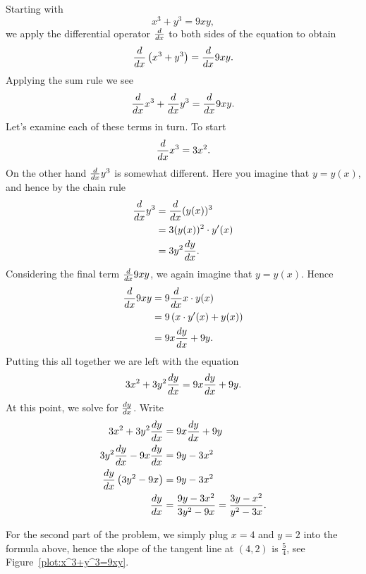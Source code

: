 \begin{solution}
Starting with 
\[
x^3+y^3 = 9xy,
\]
we apply the differential operator $\frac{d}{dx}$ to both sides of the
equation to obtain
\[
\frac{d}{dx} \left(x^3+y^3\right) = \frac{d}{dx} 9xy.
\]
Applying the sum rule we see
\[
\frac{d}{dx} x^3+\frac{d}{dx} y^3 = \frac{d}{dx} 9xy.
\]
Let's examine each of these terms in turn. To start
\[
\frac{d}{dx} x^3 = 3x^2.
\]
On the other hand $\frac{d}{dx} y^3$ is somewhat different. Here you imagine that $y = y(x)$, and hence by the chain rule
\begin{align*}
\frac{d}{dx} y^3 &= \frac{d}{dx} (y(x))^3 \\ 
&= 3(y(x))^2 \cdot y'(x) \\
&= 3y^2\frac{dy}{dx}.
\end{align*}
Considering the final term $\frac{d}{dx} 9xy$, we again imagine that $y=y(x)$. Hence 
\begin{align*}
\frac{d}{dx} 9xy &= 9\frac{d}{dx} x\cdot y(x) \\
&= 9 \left(x\cdot y'(x) + y(x)\right)\\
&= 9x \frac{dy}{dx} + 9y.
\end{align*}
Putting this all together we are left with the equation
\[
3x^2 + 3y^2\frac{dy}{dx} =9x \frac{dy}{dx} + 9y.
\]
At this point, we solve for $\frac{dy}{dx}$. Write
\begin{align*}
3x^2 + 3y^2\frac{dy}{dx} &= 9x \frac{dy}{dx} + 9y\\
3y^2\frac{dy}{dx} -  9x \frac{dy}{dx} &= 9y - 3x^2\\
\frac{dy}{dx}\left(3y^2-9x\right)&= 9y - 3x^2\\
\frac{dy}{dx} &=\frac{9y - 3x^2}{3y^2-9x} = \frac{3y - x^2}{y^2-3x}.
\end{align*}

For the second part of the problem, we simply plug $x=4$ and $y=2$
into the formula above, hence the slope of the tangent line at $(4,2)$
is $\frac{5}{4}$, see Figure~\ref{plot:x^3+y^3=9xy}.
\end{solution}
\enlargethispage{1in}

